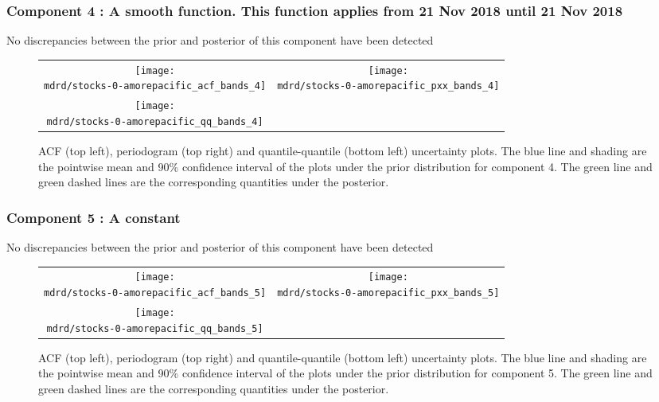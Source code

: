 \documentclass{article} %
\begin{document}
\subsubsection{Component 4 : A smooth function. This function applies from 21 Nov 2018 until 21 Nov 2018}

No discrepancies between the prior and posterior of this component have been detected

\begin{figure}[H]
\newcommand{\wmgd}{0.5\columnwidth}
\newcommand{\hmgd}{3.0cm}
\newcommand{\mdrd}{stocks-0-amorepacific}
\newcommand{\mbm}{\hspace{-0.3cm}}
\begin{tabular}{cc}
\mbm \texttt{[image: \\mdrd/stocks-0-amorepacific\_acf\_bands\_4]} & \texttt{[image: \\mdrd/stocks-0-amorepacific\_pxx\_bands\_4]} \\
\mbm \texttt{[image: \\mdrd/stocks-0-amorepacific\_qq\_bands\_4]}
\end{tabular}
\caption{
ACF (top left), periodogram (top right) and quantile-quantile (bottom left) uncertainty plots.
The blue line and shading are the pointwise mean and 90\% confidence interval of the plots under the prior distribution for component 4.
The green line and green dashed lines are the corresponding quantities under the posterior.}
\label{fig:check4}
\end{figure}

\subsubsection{Component 5 : A constant}

No discrepancies between the prior and posterior of this component have been detected

\begin{figure}[H]
\newcommand{\wmgd}{0.5\columnwidth}
\newcommand{\hmgd}{3.0cm}
\newcommand{\mdrd}{stocks-0-amorepacific}
\newcommand{\mbm}{\hspace{-0.3cm}}
\begin{tabular}{cc}
\mbm \texttt{[image: \\mdrd/stocks-0-amorepacific\_acf\_bands\_5]} & \texttt{[image: \\mdrd/stocks-0-amorepacific\_pxx\_bands\_5]} \\
\mbm \texttt{[image: \\mdrd/stocks-0-amorepacific\_qq\_bands\_5]}
\end{tabular}
\caption{
ACF (top left), periodogram (top right) and quantile-quantile (bottom left) uncertainty plots.
The blue line and shading are the pointwise mean and 90\% confidence interval of the plots under the prior distribution for component 5.
The green line and green dashed lines are the corresponding quantities under the posterior.}
\label{fig:check5}
\end{figure}
\end{document}

